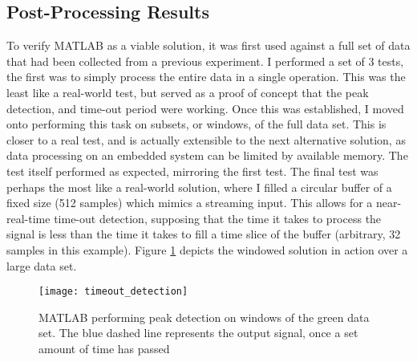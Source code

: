 \label{sec::simulation}
\subsection{Post-Processing Results}
	To verify MATLAB as a viable solution, it was first used against a full set of data that had been collected from a previous experiment. I performed a set of 3 tests, the first was to simply process the entire data in a single operation. This was the least like a real-world test, but served as a proof of concept that the peak detection, and time-out period were working. Once this was established, I moved onto performing this task on subsets, or windows, of the full data set. This is closer to a real test, and is actually extensible to the next alternative solution, as data processing on an embedded system can be limited by available memory. The test itself performed as expected, mirroring the first test. The final test was perhaps the most like a real-world solution, where I filled a circular buffer of a fixed size (512 samples) which mimics a streaming input. This allows for a near-real-time time-out detection, supposing that the time it takes to process the signal is less than the time it takes to fill a time slice of the buffer (arbitrary, 32 samples in this example). Figure \ref{fig::timeout_detection} depicts the windowed solution in action over a large data set.
	
	\begin{figure}[htbp!]
		\centering
		\texttt{[image: timeout\_detection]}
		\caption[MATLAB windowed peak detection on generated data]{MATLAB performing peak detection on windows of the green data set. The blue dashed line represents the output signal, once a set amount of time has passed}
		\label{fig::timeout_detection}
	\end{figure}
